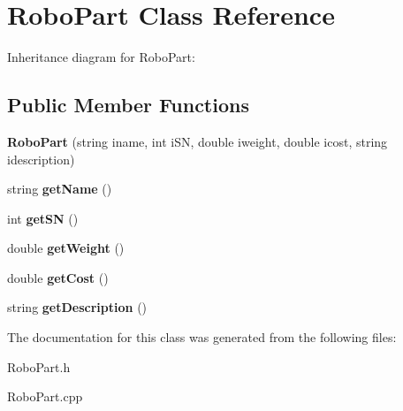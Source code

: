 \hypertarget{classRoboPart}{}\section{Robo\+Part Class Reference}
\label{classRoboPart}


Inheritance diagram for Robo\+Part\+:
\subsection*{Public Member Functions}
\begin{DoxyCompactItemize}
\item 
{\bfseries Robo\+Part} (string iname, int i\+SN, double iweight, double icost, string idescription)\hypertarget{classRoboPart_ad0a9fb48cbe96b0676c75b42406e1589}{}\label{classRoboPart_ad0a9fb48cbe96b0676c75b42406e1589}

\item 
string {\bfseries get\+Name} ()\hypertarget{classRoboPart_a15e14aabad982b0ce7814f7967cbdb33}{}\label{classRoboPart_a15e14aabad982b0ce7814f7967cbdb33}

\item 
int {\bfseries get\+SN} ()\hypertarget{classRoboPart_ac098652b1b51c6c2a96fcacc50b39461}{}\label{classRoboPart_ac098652b1b51c6c2a96fcacc50b39461}

\item 
double {\bfseries get\+Weight} ()\hypertarget{classRoboPart_a73201f11b77c9625e1b352402b9dc304}{}\label{classRoboPart_a73201f11b77c9625e1b352402b9dc304}

\item 
double {\bfseries get\+Cost} ()\hypertarget{classRoboPart_a502e942ceb687853f3b97a2d98e13295}{}\label{classRoboPart_a502e942ceb687853f3b97a2d98e13295}

\item 
string {\bfseries get\+Description} ()\hypertarget{classRoboPart_a8672f56c5dfd869000707aaa9f90b6ea}{}\label{classRoboPart_a8672f56c5dfd869000707aaa9f90b6ea}

\end{DoxyCompactItemize}


The documentation for this class was generated from the following files\+:\begin{DoxyCompactItemize}
\item 
Robo\+Part.\+h\item 
Robo\+Part.\+cpp\end{DoxyCompactItemize}
